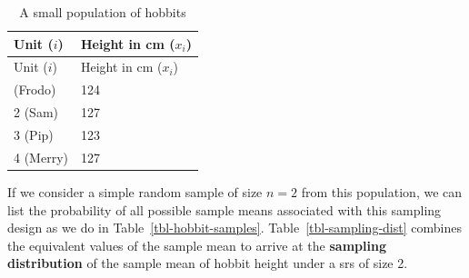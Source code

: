 \documentclass[
  13pt,
  letterpaper,
  DIV=11,
  numbers=noendperiod]{scrreprt}
\theoremstyle{definition}
\theoremstyle{definition}
\theoremstyle{plain}
\theoremstyle{remark}
\begin{document}
\begin{longtable}[]{@{}ll@{}}
\caption{A small population of
hobbits}\label{tbl-hobbit-pop}\tabularnewline
\toprule\noalign{}
Unit (\(i\)) & Height in cm (\(x_i\)) \\
\midrule\noalign{}
\endfirsthead
\toprule\noalign{}
Unit (\(i\)) & Height in cm (\(x_i\)) \\
\midrule\noalign{}
\endhead
\bottomrule\noalign{}
\endlastfoot
1 (Frodo) & 124 \\
2 (Sam) & 127 \\
3 (Pip) & 123 \\
4 (Merry) & 127 \\
\end{longtable}

If we consider a simple random sample of size \(n=2\) from this
population, we can list the probability of all possible sample means
associated with this sampling design as we do in
Table~\ref{tbl-hobbit-samples}. Table~\ref{tbl-sampling-dist} combines
the equivalent values of the sample mean to arrive at the
\textbf{sampling distribution} of the sample mean of hobbit height under
a srs of size 2.
\end{document}
